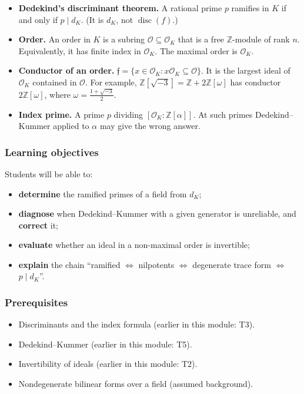 \documentclass[11pt]{article}
\newcommand{\Z}{\mathbb{Z}}
\newcommand{\OK}{\mathcal{O}_K}
\newcommand{\cO}{\mathcal{O}}
\DeclareMathOperator{\disc}{disc}
\begin{document}
\begin{keydefs}
\begin{itemize}
  \item \textbf{Dedekind's discriminant theorem.} A rational prime $p$ ramifies in $K$ if and only if $p\mid d_K$. (It is $d_K$, not $\disc(f)$.)
  \item \textbf{Order.} An order in $K$ is a subring $\cO\subseteq\OK$ that is a free $\Z$-module of rank $n$. Equivalently, it has finite index in $\OK$. The maximal order is $\OK$.
  \item \textbf{Conductor of an order.} $\mathfrak f=\{x\in\OK: x\OK\subseteq\cO\}$. It is the largest ideal of $\OK$ contained in $\cO$. For example, $\Z[\sqrt{-3}]=\Z+2\Z[\omega]$ has conductor $2\Z[\omega]$, where $\omega=\frac{1+\sqrt{-3}}2$.
  \item \textbf{Index prime.} A prime $p$ dividing $[\OK:\Z[\alpha]]$. At such primes Dedekind--Kummer applied to $\alpha$ may give the wrong answer.
\end{itemize}
\end{keydefs}

\subsubsection*{Learning objectives}
Students will be able to:
\begin{itemize}
  \item \textbf{determine} the ramified primes of a field from $d_K$;
  \item \textbf{diagnose} when Dedekind--Kummer with a given generator is unreliable, and \textbf{correct} it;
  \item \textbf{evaluate} whether an ideal in a non-maximal order is invertible;
  \item \textbf{explain} the chain ``ramified $\iff$ nilpotents $\iff$ degenerate trace form $\iff$ $p\mid d_K$''.
\end{itemize}

\subsubsection*{Prerequisites}
\begin{itemize}
  \item Discriminants and the index formula (earlier in this module: T3).
  \item Dedekind--Kummer (earlier in this module: T5).
  \item Invertibility of ideals (earlier in this module: T2).
  \item Nondegenerate bilinear forms over a field (assumed background).
\end{itemize}
\end{document}
